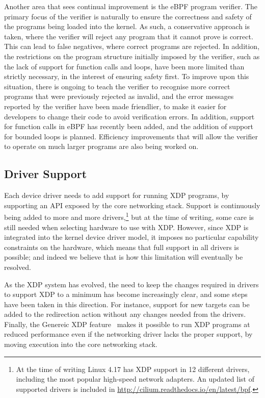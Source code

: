 \documentclass[10pt,sigconf]{acmart}
\begin{document}
Another area that sees continual improvement is the eBPF program verifier. The
primary focus of the verifier is naturally to ensure the correctness and safety
of the programs being loaded into the kernel. As such, a conservative approach
is taken, where the verifier will reject any program that it cannot prove is
correct. This can lead to false negatives, where correct programs are rejected.
In addition, the restrictions on the program structure initially imposed by the
verifier, such as the lack of support for function calls and loops, have been
more limited than strictly necessary, in the interest of ensuring safety first.
To improve upon this situation, there is ongoing to teach the verifier to
recognise more correct programs that were previously rejected as invalid, and
the error messages reported by the verifier have been made friendlier, to make
it easier for developers to change their code to avoid verification errors. In
addition, support for function calls in eBPF has recently been added, and the
addition of support for bounded loops is planned. Efficiency improvements that
will allow the verifier to operate on much larger programs are also being worked
on.

\subsection{Driver Support}
\label{sec:driver-support}
Each device driver needs to add support for running XDP programs, by supporting
an API exposed by the core networking stack. Support is continuously being added
to more and more drivers,\footnote{At the time of writing Linux 4.17 has XDP
  support in 12 different drivers, including the most popular high-speed network
  adapters. An updated list of supported drivers is included in
  \url{http://cilium.readthedocs.io/en/latest/bpf}.} but at the time of writing,
some care is still needed when selecting hardware to use with XDP. However,
since XDP is integrated into the kernel device driver model, it imposes no
particular capability constraints on the hardware, which means that full support
in all drivers is possible; and indeed we believe that is how this limitation
will eventually be resolved.

As the XDP system has evolved, the need to keep the changes required in drivers
to support XDP to a minimum has become increasingly clear, and some steps have
been taken in this direction. For instance, support for new targets can be added
to the redirection action without any changes needed from the drivers. Finally,
the Genereic XDP feature~\cite{generic-xdp} makes it possible to run XDP
programs at reduced performance even if the networking driver lacks the proper
support, by moving execution into the core networking stack.
\end{document}
